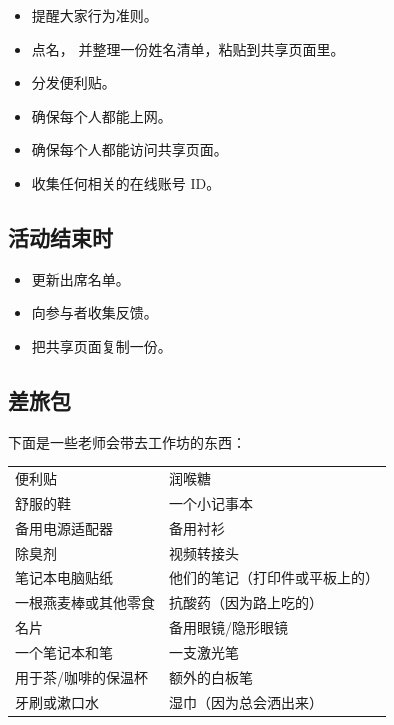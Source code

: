 \begin{itemize}

\item
  提醒大家行为准则。

\item
  点名，
  并整理一份姓名清单，粘贴到共享页面里。

\item
  分发便利贴。

\item
  确保每个人都能上网。
  
\item
  确保每个人都能访问共享页面。

\item
  收集任何相关的在线账号 ID。

\end{itemize}

\subsection*{活动结束时}

\begin{itemize}

\item
  更新出席名单。

\item
  向参与者收集反馈。

\item
  把共享页面复制一份。

\end{itemize}

\subsection*{差旅包}

下面是一些老师会带去工作坊的东西：

\begin{longtable}{p{}p{}}

便利贴 & 润喉糖 \\
舒服的鞋 & 一个小记事本 \\
备用电源适配器 & 备用衬衫 \\
除臭剂 & 视频转接头 \\
笔记本电脑贴纸 & 他们的笔记（打印件或平板上的） \\
一根燕麦棒或其他零食 & 抗酸药（因为路上吃的） \\
名片 & 备用眼镜/隐形眼镜 \\
一个笔记本和笔 & 一支激光笔 \\
用于茶/咖啡的保温杯 & 额外的白板笔 \\
牙刷或漱口水 & 湿巾（因为总会洒出来） \\

\end{longtable}

